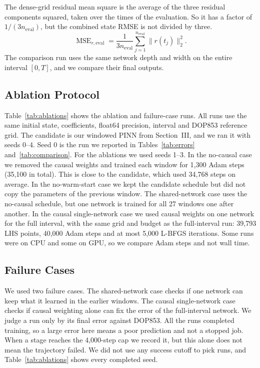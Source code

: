 \documentclass[conference]{IEEEtran}
\begin{document}
The dense-grid residual mean square is the average of the three residual components squared, taken over the times of the evaluation. So it has a factor of $1/(3n_{\mathrm{eval}})$, but the combined state RMSE is not divided by three.
\[
\operatorname{MSE}_{r,\mathrm{eval}}
=\frac{1}{3n_{\mathrm{eval}}}\sum_{j=1}^{n_{\mathrm{eval}}}\|r(t_j)\|_2^2.
\]
 The comparison run uses the same network depth and width on the entire interval $[0,T]$, and we compare their final outputs.

\subsection{Ablation Protocol}
Table~\ref{tab:ablations} shows the ablation and failure-case runs. All runs use the same initial state, coefficients, float64 precision, interval and DOP853 reference grid. The candidate is our windowed PINN from Section~III, and we ran it with seeds 0--4. Seed 0 is the run we reported in Tables~\ref{tab:errors} and~\ref{tab:comparison}. For the ablations we used seeds 1--3. In the no-causal case we removed the causal weights and trained each window for 1,300 Adam steps (35,100 in total). This is close to the candidate, which used 34,768 steps on average. In the no-warm-start case we kept the candidate schedule but did not copy the parameters of the previous window. The shared-network case uses the no-causal schedule, but one network is trained for all 27 windows one after another. In the causal single-network case we used causal weights on one network for the full interval, with the same grid and budget as the full-interval run: 39,793 LHS points, 40,000 Adam steps and at most 5,000 L-BFGS iterations. Some runs were on CPU and some on GPU, so we compare Adam steps and not wall time.

\subsection{Failure Cases}
We used two failure cases. The shared-network case checks if one network can keep what it learned in the earlier windows. The causal single-network case checks if causal weighting alone can fix the error of the full-interval network. We judge a run only by its final error against DOP853. All the runs completed training, so a large error here means a poor prediction and not a stopped job. When a stage reaches the 4,000-step cap we record it, but this alone does not mean the trajectory failed. We did not use any success cutoff to pick runs, and Table~\ref{tab:ablations} shows every completed seed.
\end{document}
